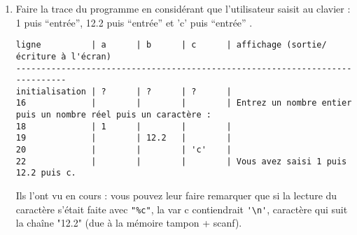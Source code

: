 \begin{enumerate}
\begin{small}
\begin{listing}{1}
/* definitions des fonctions utilisateurs */
\end{listing}
\end{small}
  \begin{correction}
    Le programme :
    \begin{itemize}
    \item déclare 3 variables a,b et c, respectivement de type entier, réel (rationnel) et caractère;
    \item demande à l'utilisateur de saisir 3 valeurs, respectivement de type entier, réel (rationnel) et caractère;
    \item affecte la valeur entière saisie à la variable entière a (même type sinon quelle est la signification ? le compilateur détecte cette erreur sémantique lors de l'analyse sémantique mais il acceptera de compiler en faisant une conversion automatique de type => source de bugs difficiles à détecter)
    \item affecte la valeur réelle saisie à la variable réelle/rationnelle b;
    \item affecte le caractère saisie à la variable caractère c;
    \item affiche les valeurs pour montrer les affectations réalisées (vous pouvez utiliser un tel programme pour vérifier que les représentations sont bornées, cf. cours et TP)
    \end{itemize}
  \end{correction}
\item Faire la trace du programme en considérant que l'utilisateur saisit au clavier : 1 puis ``entrée'', 12.2 puis ``entrée'' et 'c' puis ``entrée'' .
\begin{correction}
\begin{verbatim}
ligne          | a      | b      | c      | affichage (sortie/écriture à l'écran)
-----------------------------------------------------------------------------
initialisation | ?      | ?      | ?      |
16             |        |        |        | Entrez un nombre entier puis un nombre réel puis un caractère :  
18             | 1      |        |        |
19             |        | 12.2   |        |
20             |        |        | 'c'    |
22             |        |        |        | Vous avez saisi 1 puis 12.2 puis c.
\end{verbatim}

Ils l'ont vu en cours : vous pouvez leur faire remarquer que si la lecture du caractère s'était faite avec \verb|"%c"|, la var c contiendrait \verb|'\n'|, caractère qui suit la chaîne "12.2" (due à la mémoire tampon + scanf).
\end{correction}
\end{enumerate}

